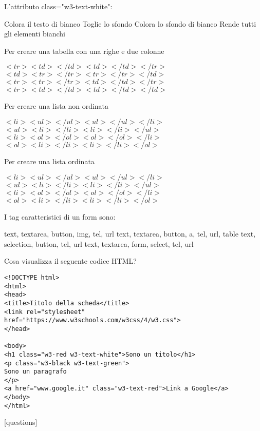 \documentclass[addpoints]{exam}
\begin{document}
\begin{questions}
\begin{multicols}{2}
\question[\half] L'attributo class="w3-text-white":
\begin{checkboxes}
	\choice Colora il testo di bianco
	\choice Toglie lo sfondo
	\choice Colora lo sfondo di bianco
	\choice Rende tutti gli elementi bianchi
\end{checkboxes}

\question[\half] Per creare una tabella con una righe e due colonne
\begin{checkboxes}
	\choice $<tr><td></td><td></td></tr>$
	\choice $<td><tr></tr><tr></tr></td>$
	\choice $<tr><tr></tr><td></td></tr>$
	\choice $<tr><td></td><td></td></td>$
\end{checkboxes}

\question[\half] Per creare una lista non ordinata
\begin{checkboxes}
	\choice $<li><ul></ul><ul></ul></li>$
	\choice $<ul><li></li><li></li></ul>$
	\choice $<li><ol></ol><ol></ol></li>$
	\choice $<ol><li></li><li></li></ol>$
\end{checkboxes}

\question[\half] Per creare una lista ordinata
\begin{checkboxes}
	\choice $<li><ul></ul><ul></ul></li>$
	\choice $<ul><li></li><li></li></ul>$
	\choice $<li><ol></ol><ol></ol></li>$
	\choice $<ol><li></li><li></li></ol>$
\end{checkboxes}

\question[\half] I tag caratteristici di un form sono:
\begin{checkboxes}
	\choice text, textarea, button, img, tel, url
	\choice text, textarea, button, a, tel, url, table
	\choice text, selection, button, tel, url
	\choice text, textarea, form, select, tel, url
\end{checkboxes}
\end{multicols}
\bonusquestion[2] Cosa visualizza il seguente codice HTML?
\begin{verbatim}
<!DOCTYPE html>
<html>
<head>
<title>Titolo della scheda</title>
<link rel="stylesheet" href="https://www.w3schools.com/w3css/4/w3.css">
</head>

<body>
<h1 class="w3-red w3-text-white">Sono un titolo</h1>
<p class="w3-black w3-text-green">
Sono un paragrafo
</p>
<a href="www.google.it" class="w3-text-red">Link a Google</a>
</body>
</html>
\end{verbatim}

\makeemptybox{2in}

\end{questions}

\begin{center}
	[questions]
\end{center}
\end{document}
